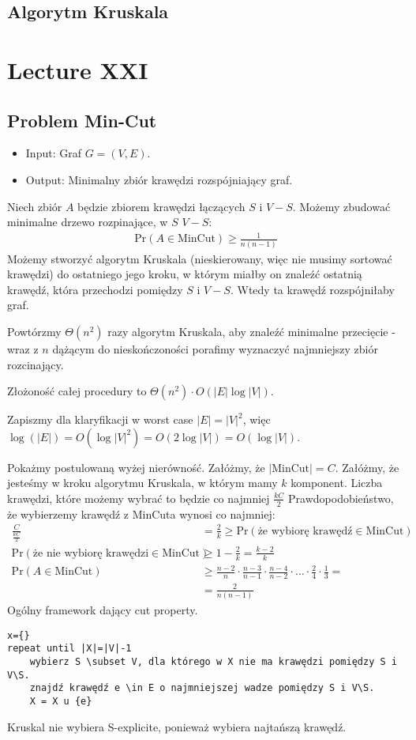 \documentclass{article}
\numberwithin{equation}{subsection}
\begin{document}
\subsection{Algorytm Kruskala}

\section{Lecture XXI}

\subsection{Problem Min-Cut}

\begin{itemize}
    \item Input: Graf $G=(V,E)$.
    \item Output: Minimalny zbiór krawędzi rozspójniający graf.
\end{itemize}
Niech zbiór $A$ będzie zbiorem krawędzi łączących $S$ i $V-S$.
Możemy zbudować minimalne drzewo rozpinające, w $S$ $V-S$:
\begin{align}
    \text{Pr}(A\in\text{MinCut}) \geq \frac{1}{n(n-1)}
\end{align}
Możemy stworzyć algorytm Kruskala (nieskierowany, więc nie musimy sortować krawędzi) do ostatniego jego kroku, w którym miałby on znaleźć ostatnią
krawędź, która przechodzi pomiędzy $S$ i $V-S$. Wtedy ta krawędź rozspójniłaby graf.

Powtórzmy $\Theta(n^2)$ razy algorytm Kruskala, aby znaleźć minimalne przecięcie - wraz z $n$ dążącym do nieskończoności porafimy wyznaczyć najmniejszy zbiór rozcinający.

Złożoność całej procedury to $\Theta(n^2) \cdot O(|E|\log |V|)$.

Zapiszmy dla klaryfikacji w worst case $|E|=|V|^2$, więc $\log(|E|) = O(\log |V|^2) = O(2\log |V|) = O(\log |V|)$.

Pokażmy postulowaną wyżej nierówność. Załóżmy, że $|\text{MinCut}|=C$.
Załóżmy, że jesteśmy w kroku algorytmu Kruskala, w którym mamy $k$ komponent.
Liczba krawędzi, które możemy wybrać to będzie co najmniej $\frac{kC}{2}$
Prawdopodobieństwo, że wybierzemy krawędź z MinCuta wynosi co najmniej:
\begin{align}
    \frac{C}{\frac{kC}{2}} &= \frac{2}{k} \geq \text{Pr}(\text{że wybiorę krawędź} \in\text{MinCut})\\
    \text{Pr}(\text{że nie wybiorę krawędzi} \in \text{MinCut}) &\geq 1 - \frac{2}{k} = \frac{k-2}{k}\\
    \text{Pr}(A\in\text{MinCut}) &\geq \frac{n-2}{n} \cdot \frac{n-3}{n-1} \cdot \frac{n-4}{n-2} \cdot \dots \cdot \frac{2}{4} \cdot \frac{1}{3} = \\
    &= \frac{2}{n(n-1)}
\end{align}
Ogólny framework dający cut property.
\begin{verbatim}
x={}
repeat until |X|=|V|-1
    wybierz S \subset V, dla którego w X nie ma krawędzi pomiędzy S i V\S.
    znajdź krawędź e \in E o najmniejszej wadze pomiędzy S i V\S.
    X = X u {e}
\end{verbatim}
Kruskal nie wybiera S-explicite, ponieważ wybiera najtańszą krawędź.
\end{document}
